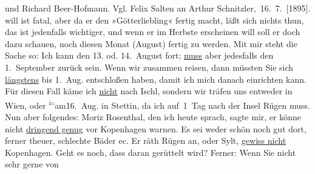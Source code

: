 \begin{ledgroupsized}[t]{13cm}
{{{                  und Richard Beer-Hofmann. Vgl. Felix Salten an Arthur Schnitzler, 16. 7. [1895]. }}}\label{K_L03159-5h} will ist
               fatal, aber da er den »Götterliebling« fertig
               macht, läßt sich nichts thun, das ist jedenfalls wichtiger, und wenn er im Herbste
               erscheinen will soll er doch dazu schauen, noch diesen Monat (August) fertig zu werden. Mit mir steht die Sache so: Ich kann den 13. od. 14. August fort;
                  \uline{muss} aber jedesfalls den 1. September zurück sein. Wenn wir zusammen reisen, dann müssten Sie sich
                  \uline{längstens} bis 1. Aug. entschloßen haben, damit ich mich danach einrichten kann. Für
               diesen Fall käme ich \uline{nicht} nach Ischl, sondern wir träfen uns entweder in Wien, oder \substVorne{}\textsuperscript{i\textcolor{gray}{n}}\substDazwischen{}am\substHinten{}{ }16. Aug. in Stettin, da ich auf 1 Tag nach der Insel Rügen muss. Nun aber folgendes: Moriz
                  Rosenthal, den ich heute sprach, sagte mir, er
               könne nicht \uline{dringend genug} vor Kopenhagen warnen. Es sei weder schön noch gut dort, ferner
               theuer, schlechte Bäder ec. Er räth Rügen an,
               oder Sylt, \uline{gewiss
                  nicht}{ }Kopenhagen. Geht es noch, dass daran gerüttelt
               wird? Ferner: Wenn Sie nicht sehr gerne von {\pb}\label{K_L03159-6v}
\end{ledgroupsized}
